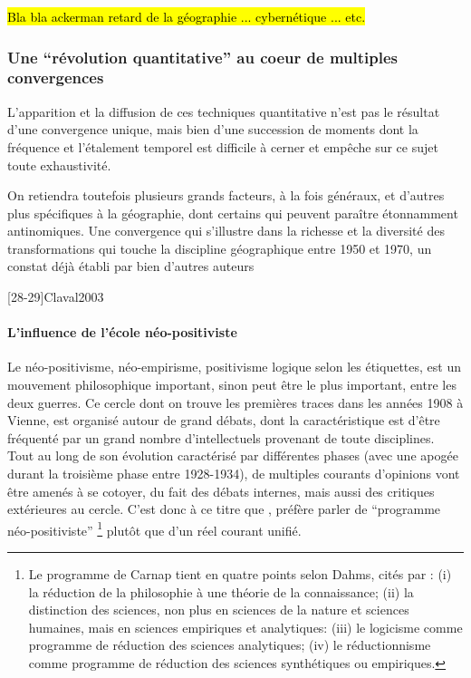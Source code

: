 \hl{Bla bla ackerman retard de la géographie ... cybernétique ... etc.}

\subsubsection{Une \enquote{révolution quantitative} au coeur de multiples convergences}

L'apparition et la diffusion de ces techniques quantitative n'est pas le résultat d'une convergence unique, mais bien d'une succession de moments dont la fréquence et l'étalement temporel est difficile à cerner et empêche sur ce sujet toute exhaustivité. 

On retiendra toutefois plusieurs grands facteurs, à la fois généraux, et d'autres plus spécifiques à la géographie, dont certains qui peuvent paraître étonnamment antinomiques. Une convergence qui s'illustre dans la richesse et la diversité des transformations qui touche la discipline géographique entre 1950 et 1970, un constat déjà établi par bien d'autres auteurs \autocite{Varenne2014}

[28-29]Claval2003

\paragraph{L'influence de l'école néo-positiviste}

Le néo-positivisme, néo-empirisme, positivisme logique selon les étiquettes, est un mouvement philosophique important, sinon peut être le plus important, entre les deux guerres. Ce cercle dont on trouve les premières traces dans les années 1908 à Vienne, est organisé autour de grand débats, dont la caractéristique est d'être fréquenté par un grand nombre d'intellectuels provenant de toute disciplines. Tout au long de son évolution caractérisé par différentes phases (avec une apogée durant la troisième phase entre 1928-1934), de multiples courants d'opinions \textcite[126]{Ouelbani2006} vont être amenés à se cotoyer, du fait des débats internes, mais aussi des critiques extérieures au cercle. C'est donc à ce titre que \textcite[11]{Ouelbani2006}, préfère parler de \enquote{programme néo-positiviste} \footnote{Le programme de Carnap tient en quatre points selon Dahms, cités par \textcite{Ouelbani2006} : (i) la réduction de la philosophie à une théorie de la connaissance; (ii) la distinction des sciences, non plus en sciences de la nature et sciences humaines, mais en sciences empiriques et analytiques: (iii) le logicisme comme programme de réduction des sciences analytiques; (iv) le réductionnisme comme programme de réduction des sciences synthétiques ou empiriques.} plutôt que d'un réel courant unifié.

